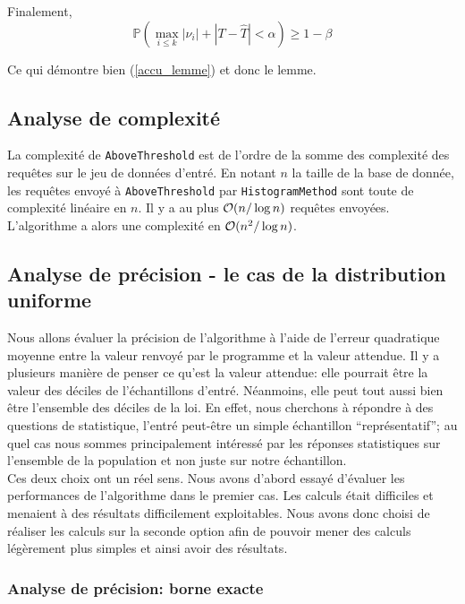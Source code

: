 Finalement, 
\[
    \mathbb P\left( \max_{i \leq k} |\nu_i| + |T - \hat T| < \alpha  \right)  \geq 1 - \beta
\]

Ce qui démontre bien (\ref{accu_lemme}) et donc le lemme.\\

\subsection{Analyse de complexité}

La complexité de \texttt{AboveThreshold} est de l'ordre de la somme des complexité des requêtes sur le jeu de données d'entré. En notant \(n\) la taille de la base de donnée, les requêtes envoyé à \texttt{AboveThreshold} par \texttt{HistogramMethod} sont toute de complexité linéaire en \(n\). Il y a au plus \(\mathcal{O}(n/\log n)\) requêtes envoyées. L'algorithme a alors une complexité en \(\mathcal{O}(n^2/\log n)\).

\subsection{Analyse de précision - le cas de la distribution uniforme}

Nous allons évaluer la précision de l'algorithme à l'aide de l'erreur quadratique moyenne entre la valeur renvoyé par le programme et la valeur attendue. Il y a plusieurs manière de penser ce qu'est la valeur attendue: elle pourrait être la valeur des déciles de l'échantillons d'entré. Néanmoins, elle peut tout aussi bien être l'ensemble des déciles de la loi. En effet, nous cherchons à répondre à des questions de statistique, l'entré peut-être un simple échantillon ``représentatif'';  au quel cas nous sommes principalement intéressé par les réponses statistiques sur l'ensemble de la population et non juste sur notre échantillon.\\

Ces deux choix ont un réel sens. Nous avons d'abord essayé d'évaluer les performances de l'algorithme dans le premier cas. Les calculs était difficiles et menaient à des résultats difficilement exploitables. Nous avons donc choisi de réaliser les calculs sur la seconde option afin de pouvoir mener des calculs légèrement plus simples et ainsi avoir des résultats.\\

\subsubsection{Analyse de précision: borne exacte}

